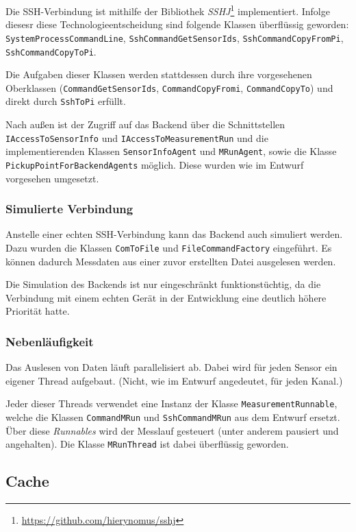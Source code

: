 \documentclass[parskip=full]{scrartcl}
\begin{document}
Die SSH-Verbindung ist mithilfe der Bibliothek \textit{SSHJ}\footnote{\url{https://github.com/hierynomus/sshj}} implementiert. Infolge diesesr diese Technologieentscheidung sind folgende Klassen überflüssig geworden: \verb:SystemProcessCommandLine:, \verb:SshCommandGetSensorIds:, \verb:SshCommandCopyFromPi:, \verb:SshCommandCopyToPi:.

Die Aufgaben dieser Klassen werden stattdessen durch ihre vorgesehenen Oberklassen (\verb:CommandGetSensorIds:, \verb:CommandCopyFromi:, \verb:CommandCopyTo:) und direkt durch \verb:SshToPi: erfüllt.

Nach außen ist der Zugriff auf das Backend über die Schnittstellen \verb:IAccessToSensorInfo: und \verb:IAccessToMeasurementRun: und die implementierenden Klassen \verb:SensorInfoAgent: und \verb:MRunAgent:, sowie die Klasse \verb:PickupPointForBackendAgents: möglich. Diese wurden wie im Entwurf vorgesehen umgesetzt.

\subsubsection{Simulierte Verbindung}

Anstelle einer echten SSH-Verbindung kann das Backend auch simuliert werden. Dazu wurden die Klassen \verb:ComToFile: und \verb:FileCommandFactory: eingeführt. Es können dadurch Messdaten aus einer zuvor erstellten Datei ausgelesen werden.

Die Simulation des Backends ist nur eingeschränkt funktionstüchtig, da die Verbindung mit einem echten Gerät in der Entwicklung eine deutlich höhere Priorität hatte.

\subsubsection{Nebenläufigkeit}

Das Auslesen von Daten läuft parallelisiert ab. Dabei wird für jeden Sensor ein eigener Thread aufgebaut. (Nicht, wie im Entwurf angedeutet, für jeden Kanal.)

Jeder dieser Threads verwendet eine Instanz der Klasse \verb:MeasurementRunnable:, welche die Klassen \verb:CommandMRun: und \verb:SshCommandMRun: aus dem Entwurf ersetzt. Über diese \textit{Runnables} wird der Messlauf gesteuert (unter anderem pausiert und angehalten). Die Klasse \verb:MRunThread: ist dabei überflüssig geworden.

\subsection{Cache}
\end{document}
